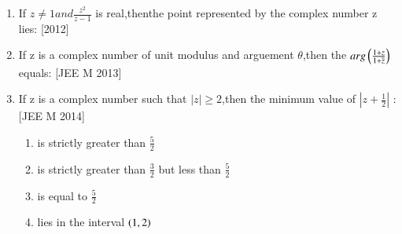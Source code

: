 \documentclass[journal,12pt,twocolumn,article]{IEEEtran}
\theoremstyle{remark}
\begin{document}
\begin{enumerate}[start = 14]
\item If $z \neq 1 and \frac{z^2}{z-1}$ is real,thenthe point represented by the complex number z lies:
\hfill{[2012]}

\begin{enumerate}

                                   
                              
                             
                                   
\end{enumerate}

\item If z is a complex number of unit modulus and arguement $\theta$,then the $arg\left(\frac{1+z}{1+\overline{z}}\right)$ equals:
\hfill{[JEE M 2013]}

\begin{enumerate}
\end{enumerate}

\item If z is a complex number such that $|z|\geq 2$,then the minimum value of $|z+\frac{1}{2}|$ :     
\hfill{[JEE M 2014]}  

\begin{enumerate}
                             
\item \text is strictly greater than $\frac{5}{2}$      

\item \text is strictly greater than $\frac{3}{2}$ but less than $\frac{5}{2}$ 
\item \text is equal to $\frac{5}{2}$ 

\item \text lies in the interval $\left(1,2\right)$ 

\end{enumerate}


\end{enumerate}
\end{document}
